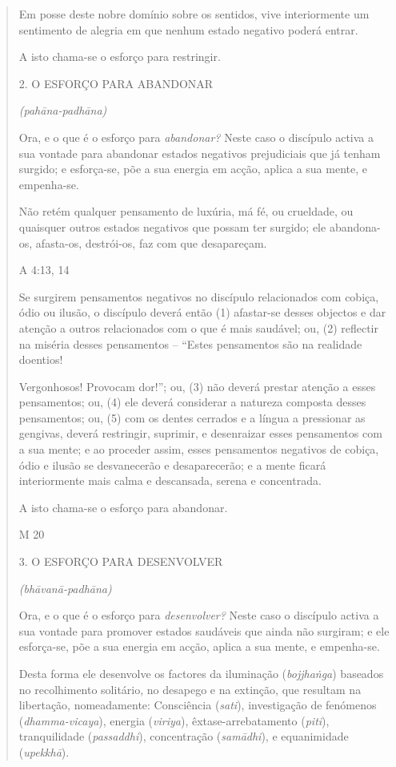 \begin{quote}
Em posse deste nobre domínio sobre os sentidos, vive interiormente um sentimento de alegria em que nenhum estado negativo poderá entrar.

A isto chama-se o esforço para restringir.

2. O ESFORÇO PARA ABANDONAR

\emph{(pahāna-padhāna)}

Ora, e o que é o esforço para \emph{abandonar?} Neste caso o discípulo activa a sua vontade para abandonar estados negativos prejudiciais que já tenham surgido; e esforça-se, põe a sua energia em acção, aplica a sua mente, e empenha-se.

Não retém qualquer pensamento de luxúria, má fé, ou crueldade, ou quaisquer outros estados negativos que possam ter surgido; ele abandona-os, afasta-os, destrói-os, faz com que desapareçam.

A 4:13, 14

Se surgirem pensamentos negativos no discípulo relacionados com cobiça, ódio ou ilusão, o discípulo deverá então (1) afastar-se desses objectos e dar atenção a outros relacionados com o que é mais saudável; ou, (2) reflectir na miséria desses pensamentos -- ``Estes pensamentos são na realidade doentios!

Vergonhosos! Provocam dor!''; ou, (3) não deverá prestar atenção a esses pensamentos; ou, (4) ele deverá considerar a natureza composta desses pensamentos; ou, (5) com os dentes cerrados e a língua a pressionar as gengivas, deverá restringir, suprimir, e desenraizar esses pensamentos com a sua mente; e ao proceder assim, esses pensamentos negativos de cobiça, ódio e ilusão se desvanecerão e desaparecerão; e a mente ficará interiormente mais calma e descansada, serena e concentrada.

A isto chama-se o esforço para abandonar.

M 20

3. O ESFORÇO PARA DESENVOLVER

\emph{(bhāvanā-padhāna)}

Ora, e o que é o esforço para \emph{desenvolver?} Neste caso o discípulo activa a sua vontade para promover estados saudáveis que ainda não surgiram; e ele esforça-se, põe a sua energia em acção, aplica a sua mente, e empenha-se.

Desta forma ele desenvolve os factores da iluminação (\emph{bojjhaṅga}) baseados no recolhimento solitário, no desapego e na extinção, que resultam na libertação, nomeadamente: Consciência (\emph{sati}), investigação de fenómenos (\emph{dhamma-vicaya}), energia (\emph{viriya}), êxtase-arrebatamento (\emph{piti}), tranquilidade (\emph{passaddhi}), concentração (\emph{samādhi}), e equanimidade (\emph{upekkhā}).


\end{quote}
